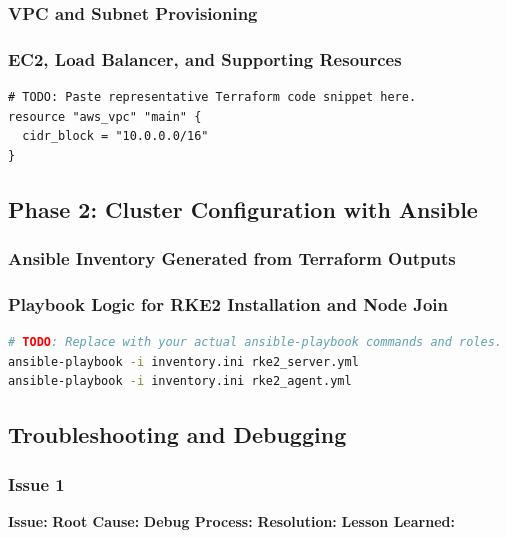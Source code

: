 \documentclass[12pt]{article}
\begin{document}
\subsubsection{VPC and Subnet Provisioning}
\subsubsection{EC2, Load Balancer, and Supporting Resources}

\begin{lstlisting}[language=hcl,caption={Example Terraform snippet for VPC provisioning},label={lst:terraform-vpc}]
# TODO: Paste representative Terraform code snippet here.
resource "aws_vpc" "main" {
  cidr_block = "10.0.0.0/16"
}
\end{lstlisting}

\subsection{Phase 2: Cluster Configuration with Ansible}
\subsubsection{Ansible Inventory Generated from Terraform Outputs}
\subsubsection{Playbook Logic for RKE2 Installation and Node Join}

\begin{lstlisting}[language=bash,caption={Example Ansible execution flow},label={lst:ansible-flow}]
# TODO: Replace with your actual ansible-playbook commands and roles.
ansible-playbook -i inventory.ini rke2_server.yml
ansible-playbook -i inventory.ini rke2_agent.yml
\end{lstlisting}

\subsection{Troubleshooting and Debugging}
\subsubsection{Issue 1}
\textbf{Issue:} %
\textbf{Root Cause:} %
\textbf{Debug Process:} %
\textbf{Resolution:} %
\textbf{Lesson Learned:} %
\end{document}
